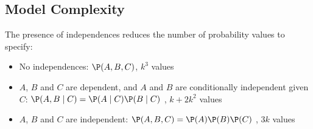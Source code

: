 \subsection{Model Complexity}
	\begin{frame}
		The presence of independences reduces the number of probability values to specify:
		\begin{itemize}
			\item \alert{No independences}: $\P( A , B , C )$, $k^3$ values
			\item $A$, $B$ and $C$ are \alert{dependent}, and $A$ and $B$ are \alert{conditionally independent} given $C$: $\P( A , B \mid C ) = \P( A \mid C ) \P( B \mid C )$ , $k + 2k^2$ values
			\item $A$, $B$ and $C$ are \alert{independent}: $\P( A , B , C ) = \P( A ) \P( B ) \P( C )$ , $3k$ values
		\end{itemize}
	\end{frame}